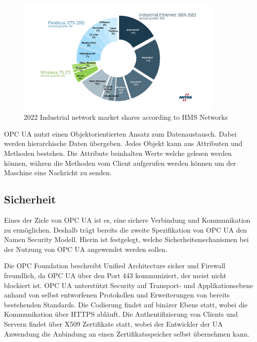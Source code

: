\documentclass[a4paper, 12pt, oneside]{scrbook}
\begin{document}
		
		\begin{figure}[H]
			\centering
			\includegraphics[width=0.9\textwidth]{res/network-shares.png}
			\caption{2022 Industrial network market shares according to HMS Networks \cite{noauthor_2022_nodate}} 
			\label{fig:share}
		\end{figure}
	
		OPC UA nutzt einen Objektorientierten Ansatz zum Datenaustausch. Dabei werden hierarchische Daten übergeben. Jedes Objekt kann aus Attributen und Methoden bestehen. Die Attribute beinhalten Werte welche gelesen werden können, währen die Methoden vom Client aufgerufen werden können um der Maschine eine Nachricht zu senden. 
		
		\subsection{Sicherheit}
		
		Eines der Ziele von OPC UA ist es, eine sichere Verbindung und Kommunikation zu ermöglichen. Deshalb trägt bereits die zweite Spezifikation von OPC UA den Namen \glqq Security Modell\grqq. Hierin ist festgelegt, welche Sicherheitsmechanismen bei der Nutzung von OPC UA angewendet werden sollen.
		
		Die OPC Foundation beschreibt Unified Architecture sicher und Firewall freundlich, da OPC UA über den Port 443 kommuniziert, der meist nicht blockiert ist. OPC UA unterstützt Security auf Transport- und Applikationsebene anhand von selbst entworfenen Protokollen und Erweiterungen von bereits bestehenden Standards. Die Codierung findet auf binärer Ebene statt, wobei die Kommunikation über HTTPS abläuft. Die Authentifizierung von Clients und Servern findet über X509 Zertifikate statt, wobei der Entwickler der UA Anwendung die Anbindung an einen Zertifikatsspeicher selbst übernehmen kann. \cite{noauthor_unified_nodate, noauthor_opc_nodate}
		
\end{document}
